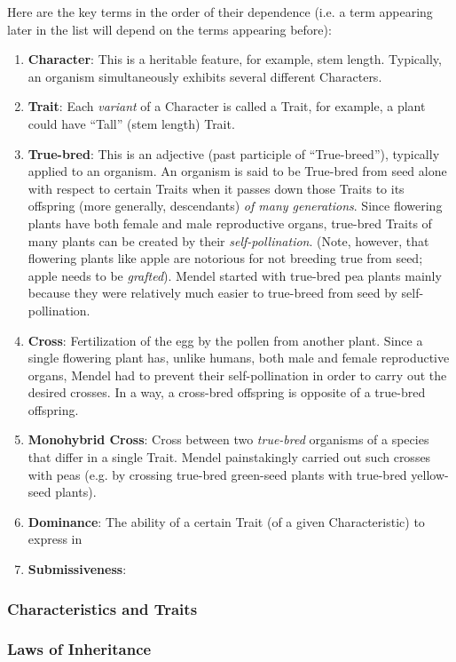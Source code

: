 \documentclass[12pt]{article}
\begin{document}
Here are the key terms in the order of their dependence (i.e. a term appearing later in the list will depend on the terms appearing before):
\begin{enumerate}
    \item \textbf{Character}: This is a heritable feature, for example, stem length. Typically, an organism simultaneously exhibits several different Characters.
    \item \textbf{Trait}: Each \emph{variant} of a Character is called a Trait, for example, a plant could have ``Tall'' (stem length) Trait.
    \item \textbf{True-bred}: This is an adjective (past participle of ``True-breed''), typically applied to an organism. An organism is said to be True-bred from seed alone with respect to certain Traits when it passes down those Traits to its offspring (more generally, descendants) \emph{of many generations}. Since flowering plants have both female and male reproductive organs, true-bred Traits of many plants can be created by their \emph{self-pollination}. (Note, however, that flowering plants like apple are notorious for not breeding true from seed; apple needs to be \emph{grafted}). Mendel started with true-bred pea plants mainly because they were relatively much easier to true-breed from seed by self-pollination.
    \item \textbf{Cross}: Fertilization of the egg by the pollen from another plant. Since a single flowering plant has, unlike humans, both male and female reproductive organs, Mendel had to prevent their self-pollination in order to carry out the desired crosses. In a way, a cross-bred offspring is opposite of a true-bred offspring.
    \item \textbf{Monohybrid Cross}: Cross between two \emph{true-bred} organisms of a species that differ in a single Trait. Mendel painstakingly carried out such crosses with peas (e.g. by crossing true-bred green-seed plants with true-bred yellow-seed plants).
    \item \textbf{Dominance}: The ability of a certain Trait (of a given Characteristic) to express in 
    \item \textbf{Submissiveness}:
\end{enumerate}

\subsubsection{Characteristics and Traits}
\subsubsection{Laws of Inheritance}
\end{document}
